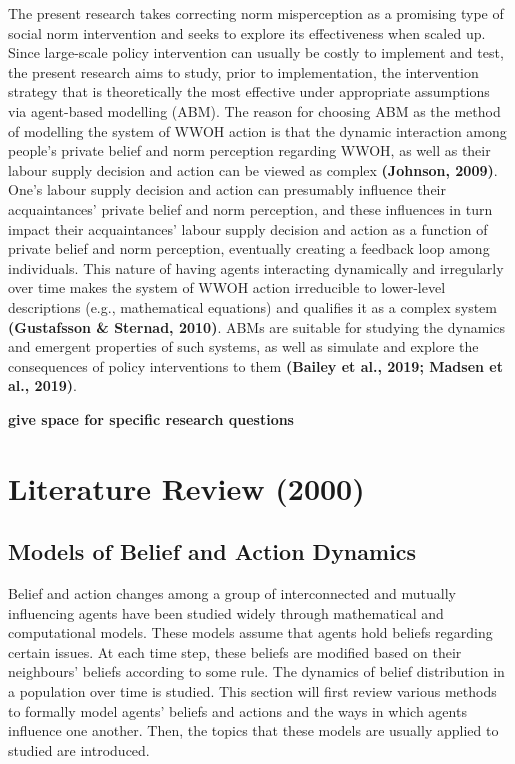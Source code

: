 \documentclass[
  11pt,
]{article}
\begin{document}
The present research takes correcting norm misperception as a promising
type of social norm intervention and seeks to explore its effectiveness
when scaled up. Since large-scale policy intervention can usually be
costly to implement and test, the present research aims to study, prior
to implementation, the intervention strategy that is theoretically the
most effective under appropriate assumptions via agent-based modelling
(ABM). The reason for choosing ABM as the method of modelling the system
of WWOH action is that the dynamic interaction among people's private
belief and norm perception regarding WWOH, as well as their labour
supply decision and action can be viewed as complex \textbf{(Johnson,
2009)}. One's labour supply decision and action can presumably influence
their acquaintances' private belief and norm perception, and these
influences in turn impact their acquaintances' labour supply decision
and action as a function of private belief and norm perception,
eventually creating a feedback loop among individuals. This nature of
having agents interacting dynamically and irregularly over time makes
the system of WWOH action irreducible to lower-level descriptions (e.g.,
mathematical equations) and qualifies it as a complex system
\textbf{(Gustafsson \& Sternad, 2010)}. ABMs are suitable for studying
the dynamics and emergent properties of such systems, as well as
simulate and explore the consequences of policy interventions to them
\textbf{(Bailey et al., 2019; Madsen et al., 2019)}.

\textbf{give space for specific research questions}

\hypertarget{literature-review-2000}{%
\section{Literature Review (2000)}\label{literature-review-2000}}

\hypertarget{models-of-belief-and-action-dynamics}{%
\subsection{Models of Belief and Action
Dynamics}\label{models-of-belief-and-action-dynamics}}

Belief and action changes among a group of interconnected and mutually
influencing agents have been studied widely through mathematical and
computational models. These models assume that agents hold beliefs
regarding certain issues. At each time step, these beliefs are modified
based on their neighbours' beliefs according to some rule. The dynamics
of belief distribution in a population over time is studied. This
section will first review various methods to formally model agents'
beliefs and actions and the ways in which agents influence one another.
Then, the topics that these models are usually applied to studied are
introduced.
\end{document}
